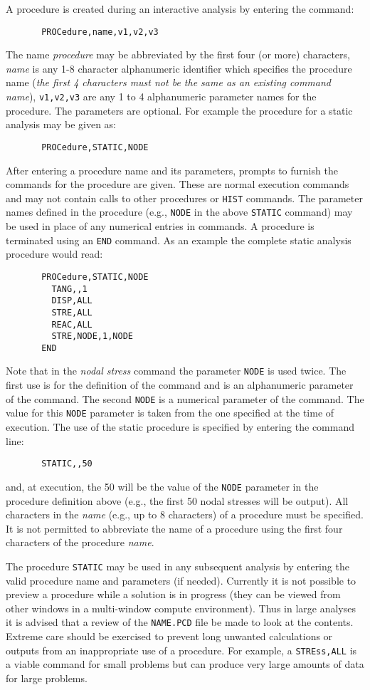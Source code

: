 A procedure is created during an interactive analysis by entering the command:
\begin{verbatim}
       PROCedure,name,v1,v2,v3
\end{verbatim}
The name {\it procedure} may be abbreviated by the first four (or more)
characters, {\it name} is any 1-8 character alphanumeric identifier
which specifies the procedure name ({\it the first 4 characters must
not be the same as an existing command name}), {\tt v1,v2,v3} are
any 1 to 4 alphanumeric parameter names for the procedure.  The
parameters are optional.  For example the procedure for
a static analysis may be given as:
\begin{verbatim}
       PROCedure,STATIC,NODE
\end{verbatim}
After entering a procedure name and its parameters,
prompts to furnish the commands
for the procedure are given.  These are normal execution commands
and may not contain calls to other procedures or {\tt HIST} commands.
The parameter names
defined in the procedure (e.g., {\tt NODE} in the above {\tt STATIC}
command) may be used in place of any numerical
entries in commands.  A procedure is terminated
using an {\tt END} command.  As an example the complete
static analysis procedure would read:
\begin{verbatim}
       PROCedure,STATIC,NODE
         TANG,,1
         DISP,ALL
         STRE,ALL
         REAC,ALL
         STRE,NODE,1,NODE
       END
\end{verbatim}
Note that in the {\it nodal stress} command the parameter {\tt NODE}
is used twice.  The first use is for the definition of the
command and is an alphanumeric parameter of the
command.  The second {\tt NODE} is a numerical parameter of
the command.  The value for this {\tt NODE} parameter is taken from the one
specified at the time of execution.  The use of
the static procedure is specified by entering the command line:
\begin{verbatim}
       STATIC,,50
\end{verbatim}
and, at execution, the 50 will be the value of the {\tt NODE} parameter in the
procedure definition above (e.g., the first 50 nodal stresses will be
output).  All characters in the {\it name} (e.g., up to 8 characters) of a 
procedure must be specified.
It is not permitted to abbreviate the name of a procedure using
the first four characters of the procedure {\it name}.

The procedure {\tt STATIC} may be used in any subsequent analysis
by entering the valid procedure name and parameters (if
needed).  Currently it is not possible to preview a procedure
while a solution is in progress (they can be viewed from other windows in
a multi-window compute environment).
Thus in large analyses it is advised that a
review of the {\tt NAME.PCD} file be made to look at the contents.
Extreme care should be exercised to prevent long unwanted
calculations or outputs from an inappropriate use of a procedure.  For
example, a {\tt STREss,ALL} is a viable command for small problems but can
produce very large amounts of data for large problems.

